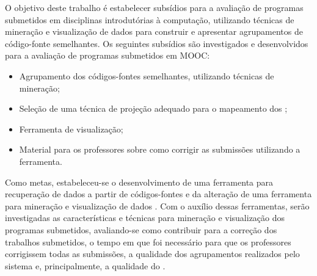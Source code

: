 %	
	
	O objetivo deste trabalho é estabelecer subsídios para a avaliação de
	programas submetidos em disciplinas introdutórias à computação, utilizando técnicas
	de mineração e visualização de dados para construir e apresentar agrupamentos de
	código-fonte semelhantes. Os seguintes subsídios são investigados e desenvolvidos
	para a avaliação de programas submetidos em \acs{MOOC}:  %
	\begin{itemize}
		\item Agrupamento dos códigos-fontes semelhantes, utilizando técnicas de mineração;
		\item Seleção de uma técnica de projeção adequado para o mapeamento dos ;
		\item Ferramenta de visualização;
		\item Material para os professores sobre como corrigir as submissões utilizando a ferramenta.
	\end{itemize}
	
	Como metas, estabeleceu-se
	o desenvolvimento de uma ferramenta para recuperação de dados a partir de
	códigos-fontes e da alteração de uma ferramenta para mineração e visualização de
	dados \cite{Alencar-etal:2012}. Com o auxílio dessas ferramentas, serão investigadas as
	características e técnicas para mineração e visualização dos programas submetidos,
	avaliando-se como contribuir para a correção dos trabalhos submetidos, o tempo em
	que foi necessário para que os professores corrigissem todas as submissões, a
	qualidade dos agrupamentos realizados pelo sistema e, principalmente, a
	qualidade do .
	
